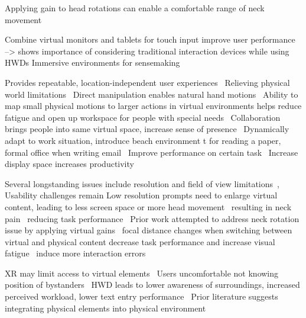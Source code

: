 Applying gain to head rotations can enable a comfortable range of neck movement~\cite{mcgill2020seatedvrworkspace}

Combine virtual monitors and tablets for touch input improve user performance~\cite{le2021vxslate} --> shows importance of considering traditional interaction devices while using HWDs 
Immersive environments for sensemaking~\cite{kobayashi2021xrspace}


Provides repeatable, location-independent user experiences~\cite{biener2022vrweek}
Relieving physical world limitations~\cite{biener2022vrweek,gruber2018officefuture}
Direct manipulation enables natural hand motions~\cite{biener2022vrweek} 
Ability to map small physical motions to larger actions in virtual environments helps reduce fatigue and open up workspace for people with special needs~\cite{biener2022vrweek}
Collaboration brings people into same virtual space, increase sense of presence~\cite{biener2022vrweek,pejsa2016room2room}
Dynamically adapt to work situation, introduce beach environment t for reading a paper, formal office when writing email~\cite{biener2022vrweek}
Improve performance on certain task~\cite{biener2024xrworkpublic,biener2022povrpoint,gesslein2020spreadsheet}
Increase display space increases productivity~\cite{biener2024xrworkpublic, czerwinski2003largedisplays} 

Several longstanding issues include resolution and field of view limitations~\cite{pavanatto2021virtualmonitor},
Usability challenges remain
Low resolution prompts need to enlarge virtual content, leading to less screen space or more head movement~\cite{pavanatto2021virtualmonitor}
resulting in neck pain~\cite{gruber2018officefuture}
reducing task performance~\cite{pavanatto2023virtualmonitor,pavanatto2021virtualmonitor} 
Prior work attempted to address neck rotation issue by applying virtual gains~\cite{mcgill2020seatedvrworkspace}
focal distance changes when switching between virtual and physical content decrease task performance and increase visual fatigue~\cite{gabbard2019arcontextswitch}
induce more interaction errors~\cite{eiberger2019depth} 

XR may limit access to virtual elements~\cite{bai2021mobile,tao2022distractions,pavanatto2024xrwild} 
Users uncomfortable not knowing position of bystanders~\cite{ohagen2020realityaware} 
HWD leads to lower awareness of surroundings, increased perceived workload, lower text entry performance~\cite{li2022mrworkspaces}
Prior literature suggests integrating physical elements into physical environment~\cite{mcgill2020challengescarmr,wang2022realitylens}

